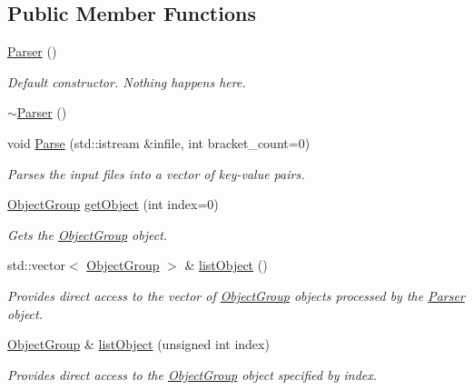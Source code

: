 \subsection*{Public Member Functions}
\begin{DoxyCompactItemize}
\item 
\hypertarget{classosea_1_1_parser_a12234f6cd36b61af4b50c94a179422c1}{\hyperlink{classosea_1_1_parser_a12234f6cd36b61af4b50c94a179422c1}{Parser} ()}\label{classosea_1_1_parser_a12234f6cd36b61af4b50c94a179422c1}

\begin{DoxyCompactList}\small\item\em Default constructor. Nothing happens here. \end{DoxyCompactList}\item 
\hyperlink{classosea_1_1_parser_a3e658b5917a93a3ef648050d060e3a93}{$\sim$\-Parser} ()
\item 
void \hyperlink{classosea_1_1_parser_a819455e27dc19323cdfd2f9354e11ec2}{Parse} (std\-::istream \&infile, int bracket\-\_\-count=0)
\begin{DoxyCompactList}\small\item\em Parses the input files into a vector of key-\/value pairs. \end{DoxyCompactList}\item 
\hyperlink{classosea_1_1_object_group}{Object\-Group} \hyperlink{classosea_1_1_parser_ab8e77da06e72ede97238d28bad4a9ae6}{get\-Object} (int index=0)
\begin{DoxyCompactList}\small\item\em Gets the \hyperlink{classosea_1_1_object_group}{Object\-Group} object. \end{DoxyCompactList}\item 
std\-::vector$<$ \hyperlink{classosea_1_1_object_group}{Object\-Group} $>$ \& \hyperlink{classosea_1_1_parser_a93885957453b4b7e346ee1b2b79d05f8}{list\-Object} ()
\begin{DoxyCompactList}\small\item\em Provides direct access to the vector of \hyperlink{classosea_1_1_object_group}{Object\-Group} objects processed by the \hyperlink{classosea_1_1_parser}{Parser} object. \end{DoxyCompactList}\item 
\hyperlink{classosea_1_1_object_group}{Object\-Group} \& \hyperlink{classosea_1_1_parser_ac7323370460e1373acf710cbe2014c9a}{list\-Object} (unsigned int index)
\begin{DoxyCompactList}\small\item\em Provides direct access to the \hyperlink{classosea_1_1_object_group}{Object\-Group} object specified by index. \end{DoxyCompactList}\item 

\end{DoxyCompactItemize}

